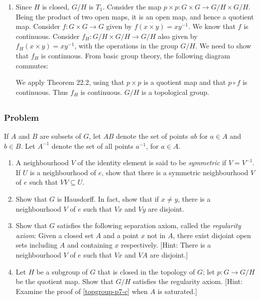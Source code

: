 \begin{enumerate}
\item Since $H$ is closed, $G/H$ is $T_1$. Consider the map $p \times p : G \times G \to G/H \times G/H$. Being the product of two open maps, it is an open map, and hence a quotient map. Consider $f : G \times G \to G$ given by $f(x \times y) = xy^{-1}$. We know that $f$ is continuous. Consider $f_H : G/H \times G/H \to G/H$ also given by $f_H(x \times y) = xy^{-1}$, with the operations in the group $G/H$. We need to show that $f_H$ is continuous. From basic group theory, the following diagram commutes:
\begin{center}
\end{center}
We apply Theorem 22.2, using that $p \times p$ is a quotient map and that $p \circ f$ is continuous. Thus $f_H$ is continuous. $G/H$ is a topological group.

\end{enumerate}


\setcounter{subsection}{6} %
\subsection{}

\subsubsection{Problem}
If $A$ and $B$ are subsets of $G$, let $AB$ denote the set of points $ab$ for $a \in A$ and $b \in B$. Let $A^{-1}$ denote the set of all points $a^{-1}$, for $a \in A$.
\begin{enumerate}
\item A neighbourhood $V$ of the identity element is said to be \emph{symmetric} if $V = V^{-1}$. If $U$ is a neighbourhood of $e$, show that there is a symmetric neighbourhood $V$ of $e$ such that $VV \subseteq U$.
\item Show that $G$ is Hausdorff. In fact, show that if $x \neq y$, there is a neighbourhood $V$ of $e$ such that $Vx$ and $Vy$ are disjoint.
\item \label{topgroup-p7-c} Show that $G$ satisfies the following separation axiom, called the \emph{regularity axiom}: Given a closed set $A$ and a point $x$ not in $A$, there exist disjoint open sets including $A$ and containing $x$ respectively. [Hint: There is a neighbourhood $V$ of $e$ such that $Vx$ and $VA$ are disjoint.]
\item  Let $H$ be a subgroup of $G$ that is closed in the topology of $G$; let $p : G \to G/H$ be the quotient map. Show that $G/H$ satisfies the regularity axiom. [Hint: Examine the proof of \ref{topgroup-p7-c} when $A$ is saturated.]
\end{enumerate}

